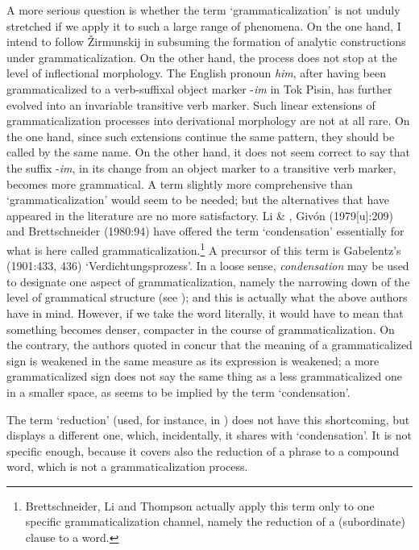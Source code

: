 A more serious question is whether the term ‘grammaticalization’ is not unduly stretched if we apply it to such a large range of phenomena. On the one hand, I intend to follow Žirmunskij in subsuming the formation of analytic constructions under grammaticalization. On the other hand, the process does not stop at the level of inflectional morphology. The English pronoun \textit{him}, after having been grammaticalized to a verb-suffixal object marker -\textit{im} in Tok Pisin, has further evolved into an invariable transitive verb marker. Such linear extensions of grammaticalization processes into derivational morphology are not at all rare. On the one hand, since such extensions continue the same pattern, they should be called by the same name. On the other hand, it does not seem correct to say that the suffix -\textit{im}, in its change from an object marker to a transitive verb marker, becomes more grammatical. A term slightly more comprehensive than ‘grammaticalization’ would seem to be needed; but the alternatives that have appeared in the literature are no more satisfactory. Li \& \citet{Thomson1974}, Givón (1979[u]:209) and Brettschneider (1980:94) have offered the term ‘condensation’ essentially for what is here called grammaticalization.\footnote{Brettschneider, Li and Thompson actually apply this term only to one specific grammaticalization channel, namely the reduction of a (subordinate) clause to a word.} A precursor of this term is Gabelentz's (1901:433, 436) ‘Verdichtungsprozess’. In a loose sense, \textit{condensation} may be used to designate one aspect of grammaticalization, namely the narrowing down of the level of grammatical structure (see ); and this is actually what the above authors have in mind. However, if we take the word literally, it would have to mean that something becomes denser, compacter in the course of grammaticalization. On the contrary, the authors quoted in  concur that the meaning of a grammaticalized sign is weakened in the same measure as its expression is weakened; a more grammaticalized sign does not say the same thing as a less grammaticalized one in a smaller space, as seems to be implied by the term ‘condensation’.

The term ‘reduction’ (used, for instance, in \citet[103-107]{Langacker1977}) does not have this shortcoming, but displays a different one, which, incidentally, it shares with ‘condensation’. It is not specific enough, because it covers also the reduction of a phrase to a compound word, which is not a grammaticalization process.

